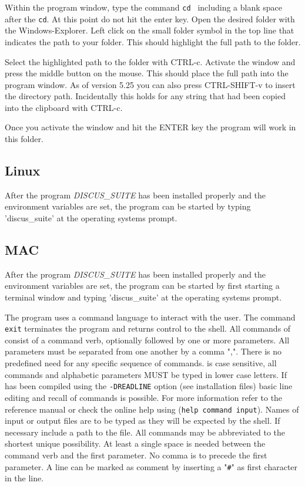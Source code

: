 Within the \Suite program window, type the command {\tt cd } including a
blank space after the {\tt cd}. At this point do not hit the enter key.
Open the desired folder with the Windows-Explorer. Left click on the
small folder symbol in the top line that indicates the path to your
folder. This should highlight the full path to the folder.

Select the highlighted path to the folder
with CTRL-c. Activate the \Suite window and press the
middle button on the mouse. This should place the full path into the
program window. As of version 5.25 you can also press CTRL-SHIFT-v to
insert the directory path. Incidentally this holds for any string that had
been copied into the clipboard with CTRL-c. 

Once you activate the window and hit the ENTER key the program will
work in this folder.

\subsection{Linux}


After the program {\it DISCUS\_SUITE} has been installed properly and the
environment variables are set, the program can be started by typing
'discus\_suite' at the operating systems prompt.

\subsection{MAC}

After the program {\it DISCUS\_SUITE} has been installed properly and the
environment variables are set, the program can be started by first 
starting a terminal window and typing
'discus\_suite' at the operating systems prompt.

The program uses a command language to interact with the user.  The
command {\tt exit} terminates the program and returns control to the
shell.  All commands of \Suite consist of a command verb,
optionally followed by one or more parameters.  All parameters must
be separated from one another by a comma ",".  There is no
predefined need for any specific sequence of commands.  \Suite     
is case sensitive, all commands and alphabetic parameters MUST be
typed in lower case letters.  If \Suite has been compiled
using the {\tt -DREADLINE} option (see installation files) basic
line editing and recall of commands is possible.  For more
information refer to the reference manual or check the online help
using ({\tt help command input}).  Names of input or output files
are to be typed as they will be expected by the shell.  If necessary
include a path to the file.  All commands may be abbreviated to the
shortest unique possibility. At least a single space is needed
between the command verb and the first parameter.  No comma is to
precede the first parameter. A line can be marked as comment by
inserting a "{\tt \#}" as first character in the line.\par

